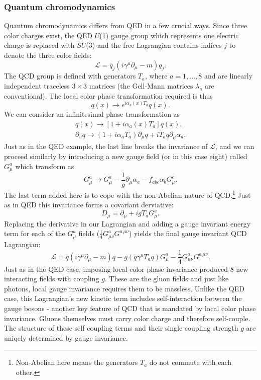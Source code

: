 \subsubsection{Quantum chromodynamics}
Quantum chromodynamics differs from QED in a few crucial ways. Since three color charges exist, the QED $U$(1) gauge group which represents one electric charge is replaced with $SU$(3) and the free Lagrangian contains indices $j$ to denote the three color fields: 
\begin{equation}
\mathcal{L} = \bar{q}_j(i\gamma^\mu\partial_\mu - m)q_j.
\end{equation}
The QCD group is defined with generators $T_a$, where $a=1,...,8$ and are linearly independent traceless $3\times3$ matrices (the Gell-Mann matrices $\lambda_a$ are conventional). The local color phase transformation required is thus 
\begin{equation}
q(x) \rightarrow e^{i\alpha_a(x)T_a}q(x).
\end{equation}
We can consider an infinitesimal phase transformation as 
\begin{equation}
\begin{split}
q(x) \rightarrow [1+i\alpha_a(x)T_a]q(x), \\ 
\partial_uq \rightarrow (1+i\alpha_aT_a)\partial_\mu q + i T_a q \partial_\mu \alpha_a.
\end{split}
\end{equation}
Just as in the QED example, the last line breaks the invariance of $\mathcal{L}$, and we can proceed similarly by introducing a new gauge field (or in this case eight) called $G_\mu^a$ which transform as
\begin{equation}
G_\mu^a \rightarrow G_\mu^a - \frac{1}{g}\partial_\mu\alpha_a - f_{abc}\alpha_b G_\mu^c.
\end{equation}
The last term added here is to cope with the non-Abelian nature of QCD.\footnote{Non-Abelian here means the generators $T_a$ do not commute with each other.} Just as in QED this invariance forms a covariant derviative:
\begin{equation}
D_\mu = \partial_\mu + i g T_aG_\mu^a.
\end{equation}
Replacing the derivative in our Lagrangian and adding a gauge invariant energy term for each of the $G_\mu^a$ fields ($\frac{1}{4}G_{\mu\nu}^a G^{a \, \mu\nu}$) yields the final gauge invariant QCD Lagrangian:
\begin{equation}
\mathcal{L} = \bar{q}(i\gamma^\mu\partial_\mu - m)q - g(\bar{q}\gamma^\mu T_aq)G_\mu^a-\frac{1}{4}G_{\mu\nu}^aG^{a \, \mu\nu}.
\end{equation}
Just as in the QED case, imposing local color phase invariance produced 8 new interacting fields with coupling $g$. These are the gluon fields and just like photons, local gauge invariance requires them to be massless. Unlike the QED case, this Lagrangian's new kinetic term includes self-interaction between the gauge bosons - another key feature of QCD that is mandated by local color phase invariance. Gluons themselves must carry color charge and therefore self-couple. The structure of these self coupling terms and their single coupling strength $g$ are uniqely determined by gauge invariance. 

